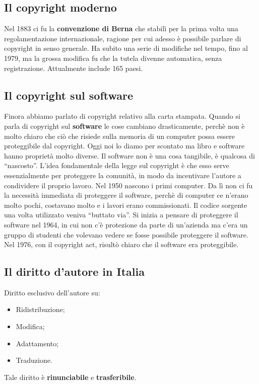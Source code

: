 \subsection{Il copyright moderno}

Nel 1883 ci fu la \textbf{convenzione di Berna} che stabilì per la prima volta una regolamentazione internazionale, ragione per cui adesso è possibile parlare di copyright in senso generale. Ha subito una serie di modifiche nel tempo, fino al 1979, ma la grossa modifica fu che la tutela divenne automatica, senza registrazione. Attualmente include 165 paesi. 

\subsection{Il copyright sul software}

Finora abbiamo parlato di copyright relativo alla carta stampata. Quando si parla di copyright sul \textbf{software} le cose cambiano drasticamente, perchè non è molto chiaro che ciò che risiede sulla memoria di un computer possa essere proteggibile dal copyright. Oggi noi lo diamo per scontato ma libro e software hanno proprietà molto diverse. Il software non è una cosa tangibile, è qualcosa di ``nascosto''. L'idea fondamentale della legge sul copyright è che esso serve essenzialmente per proteggere la comunità, in modo da incentivare l'autore a condividere il proprio lavoro. Nel 1950 nascono i primi computer. Da lì non ci fu la necessità immediata di proteggere il software, perchè di computer ce n'erano molto pochi, costavano molto e i lavori erano commissionati. Il codice sorgente una volta utilizzato veniva ``buttato via''. Si inizia a pensare di proteggere il software nel 1964, in cui non c'è protezione da parte di un'azienda ma c'era un gruppo di studenti che volevano vedere se fosse possibile proteggere il software. Nel 1976, con il copyright act, risultò chiaro che il software era proteggibile. 

\subsection{Il diritto d'autore in Italia}

Diritto esclusivo dell'autore su:

\begin{itemize}

\item Ridistribuzione;
\item Modifica;
\item Adattamento;
\item Traduzione.

\end{itemize}

Tale diritto è \textbf{rinunciabile} e \textbf{trasferibile}.
